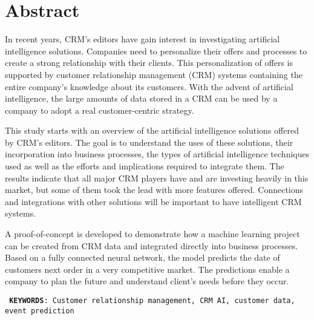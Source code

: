 

\chapter*{Abstract}

\vspace{0.5cm}

In recent years, CRM's editors have gain interest in investigating artificial intelligence solutions. Companies need to personalize their offers and processes to create a strong relationship with their clients. This personalization of offers is supported by customer relationship management (CRM) systems containing the entire company's knowledge about its customers. With the advent of artificial intelligence, the large amounts of data stored in a CRM can be used by a company to adopt a real customer-centric strategy.

This study starts with an overview of the artificial intelligence solutions offered by CRM's editors. The goal is to understand the uses of these solutions, their incorporation into business processes, the types of artificial intelligence techniques used as well as the efforts and implications required to integrate them. The results indicate that all major CRM players have and are investing heavily in this market, but some of them took the lead with more features offered. Connections and integrations with other solutions will be important to have intelligent CRM systems.

A proof-of-concept is developed to demonstrate how a machine learning project can be created from CRM data and integrated directly into business processes. Based on a fully connected neural network, the model predicts the date of customers next order in a very competitive market. The predictions enable a company to plan the future and understand client's needs before they occur.

\vspace{0.7cm}

\texttt{ \justifyi \textbf{KEYWORDS}: Customer relationship management, CRM AI, customer data, event prediction}

